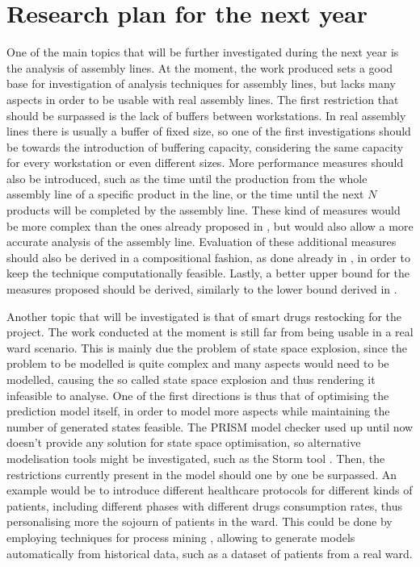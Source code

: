 
\section*{Research plan for the next year}

  One of the main topics that will be further investigated during the next year is the analysis of assembly lines. At the moment, the work produced \cite{biagi2017inspection} sets a good base for investigation of analysis techniques for assembly lines, but lacks many aspects in order to be usable with real assembly lines. The first restriction that should be surpassed is the lack of buffers between workstations. In real assembly lines there is usually a buffer of fixed size, so one of the first investigations should be towards the introduction of buffering capacity, considering the same capacity for every workstation or even different sizes. More performance measures should also be introduced, such as the time until the production from the whole assembly line of a specific product in the line, or the time until the next $N$ products will be completed by the assembly line. These kind of measures would be more complex than the ones already proposed in \cite{biagi2017inspection}, but would also allow a more accurate analysis of the assembly line. Evaluation of these additional measures should also be derived in a compositional fashion, as done already in \cite{biagi2017inspection}, in order to keep the technique computationally feasible. Lastly, a better upper bound for the measures proposed should be derived, similarly to the lower bound derived in \cite{biagi2017inspection}.
  
  Another topic that will be investigated is that of smart drugs restocking for the  project. The work conducted at the moment is still far from being usable in a real ward scenario. This is mainly due the problem of state space explosion, since the problem to be modelled is quite complex and many aspects would need to be modelled, causing the so called state space explosion and thus rendering it infeasible to analyse. One of the first directions is thus that of optimising the prediction model itself, in order to model more aspects while maintaining the number of generated states feasible. The PRISM model checker used up until now doesn't provide any solution for state space optimisation, so alternative modelisation tools might be investigated, such as the Storm tool \cite{dehnert2017storm}. Then, the restrictions currently present in the model should one by one be surpassed. An example would be to introduce different healthcare protocols for different kinds of patients, including different phases with different drugs consumption rates, thus personalising more the sojourn of patients in the ward. This could be done by employing techniques for process mining \cite{van2004workflow}, allowing to generate models automatically from historical data, such as a dataset of patients from a real ward.
  
